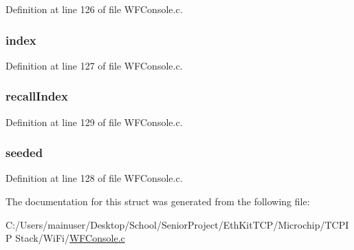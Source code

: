 Definition at line 126 of file W\+F\+Console.\+c.

\hypertarget{structhistory__struct_a6dc036ae121d473e80cf2815a3e5549e}{}
\subsubsection[{index}]{ index}\label{structhistory__struct_a6dc036ae121d473e80cf2815a3e5549e}


Definition at line 127 of file W\+F\+Console.\+c.

\hypertarget{structhistory__struct_ac4e3e0a73368ca4b2c373b4f7a1e33ba}{}
\subsubsection[{recall\+Index}]{ recall\+Index}\label{structhistory__struct_ac4e3e0a73368ca4b2c373b4f7a1e33ba}


Definition at line 129 of file W\+F\+Console.\+c.

\hypertarget{structhistory__struct_aaa407061ffd9b3743479271b44745e9d}{}
\subsubsection[{seeded}]{ seeded}\label{structhistory__struct_aaa407061ffd9b3743479271b44745e9d}


Definition at line 128 of file W\+F\+Console.\+c.



The documentation for this struct was generated from the following file\+:\begin{DoxyCompactItemize}
\item 
C\+:/\+Users/mainuser/\+Desktop/\+School/\+Senior\+Project/\+Eth\+Kit\+T\+C\+P/\+Microchip/\+T\+C\+P\+I\+P Stack/\+Wi\+Fi/\hyperlink{_w_f_console_8c}{W\+F\+Console.\+c}\end{DoxyCompactItemize}
